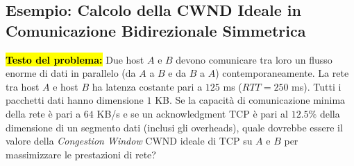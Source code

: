 \documentclass[11pt,a4paper]{report}
\begin{document}
\subsection{Esempio: Calcolo della CWND Ideale in Comunicazione Bidirezionale Simmetrica}
\hl{\textbf{Testo del problema:}} Due host $A$ e $B$ devono comunicare tra loro un flusso enorme di dati in parallelo (da $A$ a $B$ e da $B$ a $A$) contemporaneamente. La rete tra host $A$ e host $B$ ha latenza costante pari a $125$ ms ($RTT = 250$ ms). Tutti i pacchetti dati hanno dimensione $1$ KB. Se la capacità di comunicazione minima della rete è pari a $64$ KB/s e se un acknowledgment TCP è pari al $12.5\%$ della dimensione di un segmento dati (inclusi gli overheads), quale dovrebbe essere il valore della \textit{Congestion Window} CWND ideale di TCP su $A$ e $B$ per massimizzare le prestazioni di rete?
\end{document}
